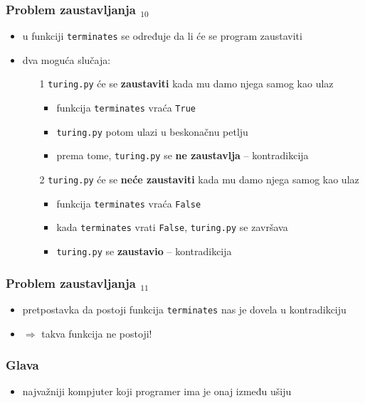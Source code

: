 \documentclass[utf8,compress,aspectratio=169]{beamer}
\begin{document}
\begin{frame}[fragile]
  \frametitle{Problem zaustavljanja $_{10}$}
  \begin{itemize}
    \item u funkciji \texttt{terminates} se određuje da li će se program zaustaviti
    \item dva moguća slučaja:
  \begin{itemize}
    \item[1] \texttt{turing.py} će se \textbf{zaustaviti} kada mu damo njega samog kao ulaz
  \begin{itemize}
    \item funkcija \texttt{terminates} vraća \texttt{True}
    \item \texttt{turing.py} potom ulazi u beskonačnu petlju
    \item prema tome, \texttt{turing.py} se \textbf{ne zaustavlja} -- kontradikcija
  \end{itemize}
    \item[2] \texttt{turing.py} će se \textbf{neće zaustaviti} kada mu damo njega samog kao ulaz
  \begin{itemize}
    \item funkcija \texttt{terminates} vraća \texttt{False}
    \item kada \texttt{terminates} vrati \texttt{False}, \texttt{turing.py} se završava
    \item \texttt{turing.py} se \textbf{zaustavio} -- kontradikcija
  \end{itemize}
  \end{itemize}
  \end{itemize}
\end{frame}

\begin{frame}[fragile]
  \frametitle{Problem zaustavljanja $_{11}$}
  \begin{itemize}
    \item pretpostavka da postoji funkcija \texttt{terminates} nas je dovela u kontradikciju
    \item $\Rightarrow$ takva funkcija ne postoji!
  \end{itemize}
\end{frame}

\begin{frame}[fragile]
  \frametitle{Glava}
  \begin{itemize}
    \item najvažniji kompjuter koji programer ima je onaj između ušiju
  \end{itemize}
\end{frame}
\end{document}
